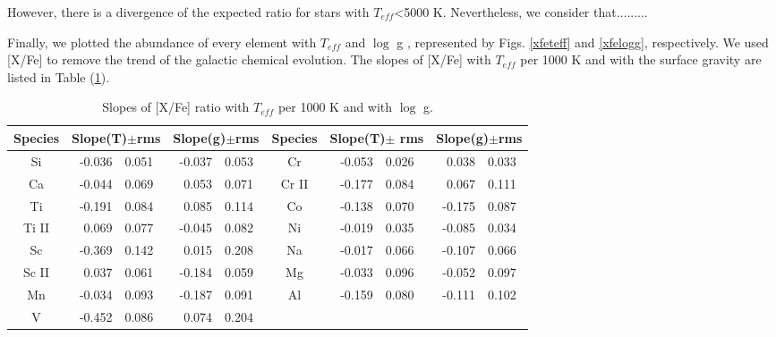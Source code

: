 \documentclass[dvips,12pt,a4paper]{report}
\begin{document}
{{However, there is a divergence of the expected ratio for stars with $T_{eff}$<5000 K. Nevertheless, we consider that.........

Finally, we plotted the abundance of every element with $T_{eff}$ and $\log$ g , represented by Figs. \ref{xfeteff} and  \ref{xfelogg}, respectively. We used [X/Fe] to remove the trend of the galactic chemical evolution. The slopes of [X/Fe] with $T_{eff}$ per 1000 K and with the surface gravity are listed in Table (\ref{slopes}).

\begin{table}[h]
\label {slopes}\scriptsize
\centering
\caption[Slopes of metallicity in function of $T{eff}$ per 1000 K ]{Slopes of [X/Fe] ratio with $T_{eff}$ per 1000 K and with $\log$ g.} 
\begin{tabular}{ c r@{$\pm$}l r@{$\pm$}l | c r@{$\pm$}l r@{$\pm$}l}

\hline
\hline 
Species & \multicolumn {2}{c}{Slope(T)$\pm$rms} & \multicolumn {2}{c}{Slope(g)$\pm$rms} & Species & \multicolumn {2}{c}{Slope(T)$\pm$ rms} & \multicolumn {2}{c}{Slope(g)$\pm$rms} \\
\hline
Si & -0.036 & 0.051 & -0.037	& 0.053 & Cr & -0.053 &   0.026 & 0.038 & 0.033 \\
Ca &  -0.044 &    0.069 & 0.053 & 0.071 & Cr II &  -0.177 & 0.084 & 0.067 & 0.111 \\
Ti & -0.191 & 0.084 & 0.085	& 0.114 & Co & -0.138 &  0.070 & -0.175 & 0.087 \\ 
Ti II &  0.069 & 0.077 & -0.045 & 0.082 &  Ni & -0.019 & 0.035 & -0.085 & 0.034 \\
Sc & -0.369 & 0.142 & 0.015 & 0.208	& Na &-0.017 &   0.066 & -0.107 & 0.066 \\
Sc II &  0.037 & 0.061 & -0.184 & 0.059 & Mg & -0.033 & 0.096& -0.052 & 0.097 \\
Mn & -0.034  &  0.093  & -0.187 & 0.091 &  Al & -0.159  &    0.080 & -0.111 & 0.102 \\
V & -0.452 & 0.086 & 0.074 & 0.204 \\
\hline

\end{tabular}
\end{table}

}}
\end{document}

